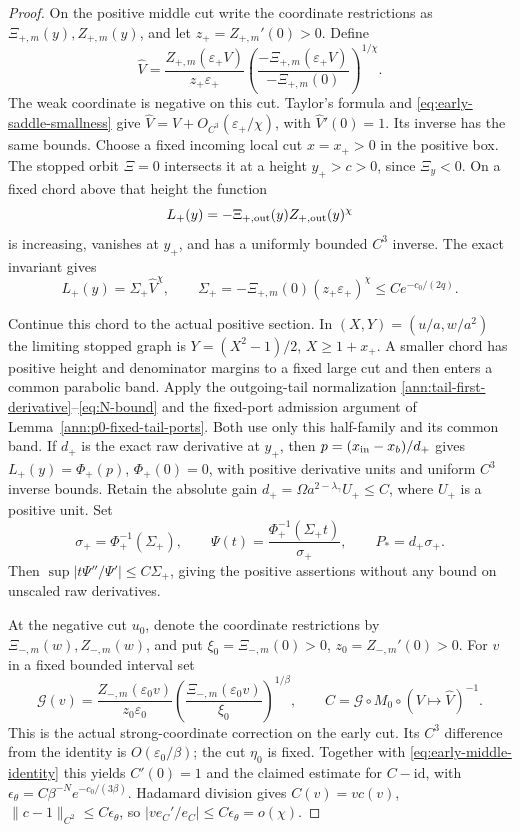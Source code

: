 \begin{proof}
On the positive middle cut write the coordinate restrictions as
\(\Xi_{+,m}(y),Z_{+,m}(y)\), and let
\(z_+=Z_{+,m}'(0)>0\). Define
\[
 \widehat V=
 \frac{Z_{+,m}(\varepsilon_+ V)}{z_+\varepsilon_+}
 \left(\frac{-\Xi_{+,m}(\varepsilon_+ V)}
                  {-\Xi_{+,m}(0)}\right)^{1/\chi} .
\]
The weak coordinate is negative on this cut. Taylor's formula and
\eqref{eq:early-saddle-smallness} give
\(\widehat V=V+O_{C^3}(\varepsilon_+/\chi)\), with
\(\widehat V'(0)=1\). Its inverse has the same bounds.
Choose a fixed incoming local cut \(x=x_+>0\) in the positive
box. The stopped orbit \(\Xi=0\) intersects it at a height
\(y_+>c>0\), since \(\Xi_y<0\). On a fixed chord above that
height the function
\[
 L_+(y)=-\Xi_{+,\rm out}(y)Z_{+,\rm out}(y)^\chi
\]
is increasing, vanishes at \(y_+\), and has a uniformly bounded
\(C^3\) inverse. The exact invariant gives
\[
 L_+(y)=\Sigma_+\widehat V^\chi,\qquad
 \Sigma_+=-\Xi_{+,m}(0)(z_+\varepsilon_+)^\chi
                    \le Ce^{-c_0/(2q)}.
\]

Continue this chord to the actual positive section. In
\((X,Y)=(u/a,w/a^2)\) the limiting stopped graph is
\(Y=(X^2-1)/2\), \(X\ge1+x_+\). A smaller chord has positive
height and denominator margins to a fixed large cut and then enters a
common parabolic band. Apply the outgoing-tail normalization
\eqref{ann:tail-first-derivative}--\eqref{eq:N-bound} and the
fixed-port admission argument of Lemma~\ref{ann:p0-fixed-tail-ports}.
Both use only this half-family and its common band. If \(d_+\) is the
exact raw derivative at \(y_+\), then
\(p=(x_{\rm in}-x_b)/d_+\) gives
\(L_+(y)=\Phi_+(p)\), \(\Phi_+(0)=0\), with positive derivative
units and uniform \(C^3\) inverse bounds. Retain the absolute gain
\(d_+=\Omega a^{2-\lambda_\gamma}U_+\le C\), where \(U_+\) is
a positive unit.
Set
\[
 \sigma_+=\Phi_+^{-1}(\Sigma_+),\qquad
 \Psi(t)=\frac{\Phi_+^{-1}(\Sigma_+t)}{\sigma_+},\qquad
 P_*=d_+\sigma_+ .
\]
Then \(\sup|t\Psi''/\Psi'|\le C\Sigma_+\), giving the
positive assertions without any bound on unscaled raw derivatives.

At the negative cut \(u_0\), denote the coordinate restrictions by
\(\Xi_{-,m}(w),Z_{-,m}(w)\), and put
\(\xi_0=\Xi_{-,m}(0)>0\), \(z_0=Z_{-,m}'(0)>0\).
For \(v\) in a fixed bounded interval set
\[
 \mathcal G(v)=\frac{Z_{-,m}(\varepsilon_0v)}{z_0\varepsilon_0}
 \left(\frac{\Xi_{-,m}(\varepsilon_0v)}{\xi_0}\right)^{1/\beta},
 \qquad C=\mathcal G\circ M_0\circ(V\mapsto\widehat V)^{-1}.
\]
This is the actual strong-coordinate correction on the early cut.
Its \(C^3\) difference from the identity is
\(O(\varepsilon_0/\beta)\); the cut \(\eta_0\) is fixed.
Together with \eqref{eq:early-middle-identity} this yields
\(C'(0)=1\) and the claimed estimate for \(C-\mathrm{id}\),
with \(\epsilon_\theta=C\beta^{-N}e^{-c_0/(3\beta)}\).
Hadamard division gives \(C(v)=v c(v)\),
\(\|c-1\|_{C^2}\le C\epsilon_\theta\), so
\(|v e_C'/e_C|\le C\epsilon_\theta=o(\chi)\).


\end{proof}
